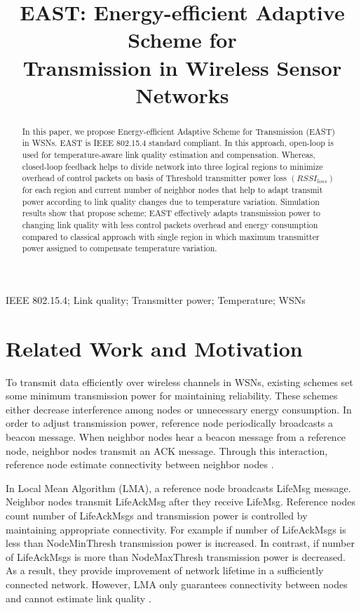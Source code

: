 \documentclass{article}
\title{EAST: Energy-efficient Adaptive Scheme for \\Transmission in Wireless Sensor Networks}
\begin{document}
\maketitle
\begin{abstract}
In this paper, we propose Energy-efficient Adaptive Scheme for Transmission (EAST) in WSNs. EAST is IEEE 802.15.4 standard compliant. In this approach, open-loop is used for temperature-aware link quality estimation and compensation. Whereas, closed-loop feedback helps to divide network into three logical regions to minimize overhead of control packets on basis of Threshold transmitter power loss $(RSSI_{loss})$ for each region and current number of neighbor nodes that help to adapt transmit power according to link quality changes due to temperature variation. Simulation results show that propose scheme; EAST effectively adapts transmission power to changing link quality with less control packets overhead and energy consumption compared to classical approach with single region in which maximum transmitter power assigned to compensate temperature variation.
\end{abstract}
\begin{keywords}
IEEE 802.15.4; Link quality; Transmitter power; Temperature; WSNs
\end{keywords}

\section{Related Work and Motivation}
\label{sec:format}

To transmit data efficiently over wireless channels in WSNs, existing schemes set some minimum transmission power for maintaining reliability. These schemes either decrease interference among nodes or unnecessary energy consumption. In order to adjust transmission power, reference node periodically broadcasts a beacon message. When neighbor nodes hear a beacon message from a reference node, neighbor nodes transmit an ACK message. Through this interaction, reference node estimate connectivity between neighbor nodes \cite{1}.


In Local Mean Algorithm (LMA), a reference node broadcasts LifeMsg message. Neighbor nodes transmit LifeAckMsg after they receive LifeMsg. Reference nodes count number of LifeAckMsgs and transmission power is controlled by maintaining appropriate connectivity. For example if number of LifeAckMsgs is less than NodeMinThresh transmission power is increased. In contrast, if number of LifeAckMsgs is more than NodeMaxThresh transmission power is decreased. As a result, they provide improvement of network lifetime in a sufficiently connected network. However, LMA only guarantees connectivity between nodes and cannot estimate link quality \cite{2}.
\end{document}

